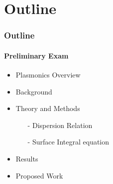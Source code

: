 \documentclass[mathserif,18pt,xcolor=table]{beamer}
\begin{document}
\section{Outline}
\begin{frame}
  \frametitle{Outline}
  \framesubtitle{Preliminary Exam}
  \begin{itemize}
    \item Plasmonics Overview
    \item Background
    \item Theory and Methods
    \begin{itemize}
      \item[-]{Dispersion Relation}
      \item[-]{Surface Integral equation}
    \end{itemize}
    \item Results
    \item Proposed Work
  \end{itemize}
\end{frame}
\end{document}
